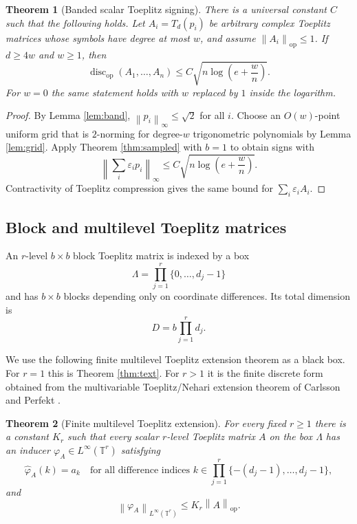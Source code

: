\documentclass[11pt]{amsart}
\numberwithin{equation}{section}
\newtheorem{theorem}{Theorem}[section]
\theoremstyle{definition}
\theoremstyle{remark}
\newcommand{\T}{\mathbb T}
\newcommand{\op}{\mathrm{op}}
\newcommand{\discop}{\operatorname{disc}_{\op}}
\newcommand{\norm}[1]{\left\lVert #1\right\rVert}
\newcommand{\eps}{\varepsilon}
\begin{document}
\begin{theorem}[Banded scalar Toeplitz signing]\label{thm:banded}
There is a universal constant $C$ such that the following holds. Let
$A_i=T_d(p_i)$ be arbitrary complex Toeplitz matrices whose symbols have degree
at most $w$, and assume $\norm{A_i}_{\op}\le 1$. If $d\ge 4w$ and $w\ge 1$,
then
\[
\discop(A_1,\ldots,A_n)
\le C\sqrt{n\log\left(e+\frac{w}{n}\right)} .
\]
For $w=0$ the same statement holds with $w$ replaced by $1$ inside the logarithm.
\end{theorem}

\begin{proof}
By Lemma \ref{lem:band}, $\norm{p_i}_\infty\le\sqrt2$ for all $i$.
Choose an $O(w)$-point uniform grid that is $2$-norming for degree-$w$
trigonometric polynomials by Lemma \ref{lem:grid}. Apply Theorem
\ref{thm:sampled} with $b=1$ to obtain signs with
\[
\norm{\sum_i\eps_i p_i}_\infty
\le C\sqrt{n\log\left(e+\frac{w}{n}\right)} .
\]
Contractivity of Toeplitz compression gives the same bound for
$\sum_i\eps_iA_i$.
\end{proof}

\subsection{Block and multilevel Toeplitz matrices}

An $r$-level $b\times b$ block Toeplitz matrix is indexed by a box
\[
\Lambda=\prod_{j=1}^r\{0,\ldots,d_j-1\}
\]
and has $b\times b$ blocks depending only on coordinate differences. Its total
dimension is
\[
D=b\prod_{j=1}^r d_j .
\]

We use the following finite multilevel Toeplitz extension theorem as a black
box. For $r=1$ this is Theorem \ref{thm:text}. For $r>1$ it is
the finite discrete form obtained from the multivariable Toeplitz/Nehari
extension theorem of Carlsson and Perfekt \cite{CarlssonPerfekt}.

\begin{theorem}[Finite multilevel Toeplitz extension]\label{thm:mltext}
For every fixed $r\ge 1$ there is a constant $K_r$ such that every scalar
$r$-level Toeplitz matrix $A$ on the box $\Lambda$ has an inducer
$\varphi_A\in L^\infty(\T^r)$ satisfying
\[
\widehat\varphi_A(k)=a_k
\quad\text{for all difference indices } k\in\prod_{j=1}^r\{-(d_j-1),\ldots,d_j-1\},
\]
and
\[
\norm{\varphi_A}_{L^\infty(\T^r)}\le K_r\norm A_{\op} .
\]
\end{theorem}
\end{document}
